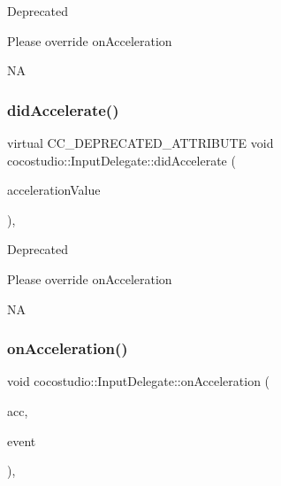 \begin{DoxyRefDesc}{Deprecated}
\item[\hyperlink{deprecated__deprecated000080}{Deprecated}]Please override on\+Acceleration \end{DoxyRefDesc}
NA \mbox{\label{classcocostudio_1_1InputDelegate_a9d0d273d96b520c48e76a04db3528183}} 
\subsubsection{\texorpdfstring{did\+Accelerate()}{didAccelerate()}\hspace{0.1cm}{\footnotesize\ttfamily [2/2]}}
{\footnotesize\ttfamily virtual C\+C\+\_\+\+D\+E\+P\+R\+E\+C\+A\+T\+E\+D\+\_\+\+A\+T\+T\+R\+I\+B\+U\+TE void cocostudio\+::\+Input\+Delegate\+::did\+Accelerate (\begin{DoxyParamCaption}\item[{cocos2d\+::\+Acceleration $\ast$}]{acceleration\+Value }\end{DoxyParamCaption})\hspace{0.3cm}{\ttfamily [final]}, {\ttfamily [virtual]}}

\begin{DoxyRefDesc}{Deprecated}
\item[\hyperlink{deprecated__deprecated000315}{Deprecated}]Please override on\+Acceleration \end{DoxyRefDesc}
NA \mbox{\label{classcocostudio_1_1InputDelegate_a0c34fc919cbe1bb4f7dd7d9ccc80ee87}} 
\subsubsection{\texorpdfstring{on\+Acceleration()}{onAcceleration()}\hspace{0.1cm}{\footnotesize\ttfamily [1/2]}}
{\footnotesize\ttfamily void cocostudio\+::\+Input\+Delegate\+::on\+Acceleration (\begin{DoxyParamCaption}\item[{cocos2d\+::\+Acceleration $\ast$}]{acc,  }\item[{cocos2d\+::\+Event $\ast$}]{event }\end{DoxyParamCaption})\hspace{0.3cm}{\ttfamily [inline]}, {\ttfamily [virtual]}}

